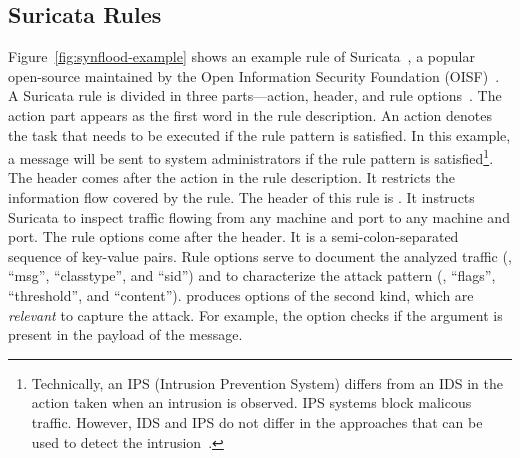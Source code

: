 \documentclass[sigconf,review, anonymous]{acmart}
\begin{document}
\subsection{Suricata Rules}
\label{sec:example-suricata-rules}

Figure~\ref{fig:synflood-example} shows an example rule of
Suricata~\cite{suricata}, a popular open-source \nids{} maintained by
the Open Information Security Foundation (OISF)~\cite{oisf}.
A Suricata rule is divided in three parts---action, header, and rule
options~\cite{suri-rule-format}. The action part appears as the first
word in the rule description. An action denotes the task that needs to
be executed if the rule pattern is satisfied.  In this example, a
message will be sent to system administrators if the rule pattern is
satisfied\footnote{Technically, an IPS (Intrusion Prevention System)
  differs from an IDS in the action taken when an intrusion is
  observed. IPS systems block malicous traffic. However, IDS and IPS
  do not differ in the approaches that can be used to detect the
  intrusion~\cite{ids-ips}.}. The header comes after the action in the rule
description. It restricts the information flow covered by the
rule. The header of this rule is . It instructs Suricata to inspect  traffic flowing
from any machine and port to any machine and port. The rule options come after the header. It is a
semi-colon-separated sequence of key-value pairs. Rule options serve
to document the analyzed traffic (\eg{}, ``msg'', ``classtype'', and
``sid'') and to characterize the attack pattern (\eg, ``flags'',
``threshold'', and ``content''). \tname{} produces options of the
second kind, which are \emph{relevant} to capture the attack. For
example, the option  checks if the argument is
present in the payload of the message.
\end{document}
